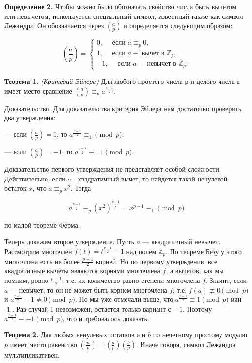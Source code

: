 \textbf{Определение 2.}
Чтобы можно было обозначать свойство числа быть вычетом или невычетом, используется специальный символ, известный также как символ Лежандра. Он обозначается через $\left(\frac{a}{p}\right)$ и определяется следующим образом:

$$
\left(\frac{a}{p}\right)=\left\{\begin{array}{l}
0, \quad \text { если } a \equiv_p 0, \\
1, \quad \text { если } a-\text { вычет в } \mathbb{Z}_p, \\
-1, \quad \text { если } a-\text { невычет в } \mathbb{Z}_p .
\end{array}\right.
$$

\textbf{Теорема 1.} \textit{(Критерий Эйлера)}
Для любого простого числа $р$ и целого числа а имеет место сравнение $\left(\frac{a}{p}\right) \equiv_p a^{\frac{p-1}{2}}$.

Доказательство. Для доказательства критерия Эйлера нам достаточно проверить два утверждения:

--- если $\left(\frac{a}{p}\right)=1$, то $a^{\frac{p-1}{2}} \equiv_ 1\pmod{p}$;

--- если $\left(\frac{a}{p}\right)=-1$, то $a^{\frac{p-1}{2}} \equiv_-1\pmod{p}$.

Доказательство первого утверждения не представляет особой сложности. Действительно, если $a$ - квадратичный вычет, то найдется такой ненулевой остаток $x$, что $a \equiv_p x^2$. Тогда

$$
a^{\frac{p-1}{2}} \equiv_p\left(x^2\right)^{\frac{p-1}{2}}=x^{p-1} \equiv_ 1\pmod{p}
$$


по малой теореме Ферма.

Теперь докажем второе утверждение. Пусть $a$ --- квадратичный невычет. Рассмотрим многочлен $f(t)=t^{\frac{p-1}{2}}-1$ над полем $\mathbb{Z}_p$. По теореме Безу у этого многочлена есть не более $\frac{p-1}{2}$ корней. Но по первому утверждению все квадратичные вычеты являются корнями многочлена $f$, а вычетов, как мы помним, ровно $\frac{p-1}{2}$, т.е. их количество равно степени многочлена $f$. Значит, если $a$ --- невычет, то он не может быть корнем многочлена $f$, т.е. $f(a) \not\equiv 0 \pmod{p}$ и $a^{\frac{p-1}{2}}-1 \neq 0 \pmod{p}$. Но мы уже отмечали выше, что $a^{\frac{p-1}{2}} \equiv 1 \pmod{p}$ или -1 . Раз случай 1 невозможен, остается только вариант $с-1$. Поэтому $a^{\frac{p-1}{2}} \equiv-1 \pmod{p}$, что и требовалось доказать.


\textbf{Теорема 2.}
Для любых ненулевых остатков а и $b$ по нечетному простому модулю $p$ имеет место равенство $\left(\frac{a b}{p}\right)=\left(\frac{a}{p}\right)\left(\frac{b}{p}\right)$. Иначе говоря, символ Лежандра мультипликативен.


